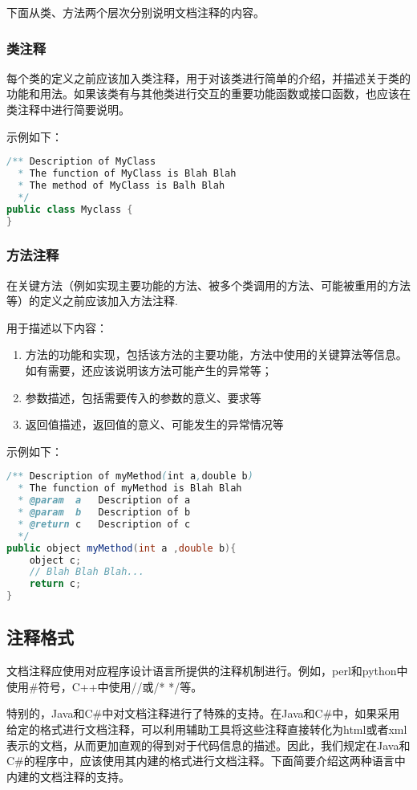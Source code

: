 下面从类、方法两个层次分别说明文档注释的内容。
\subsubsection{类注释}

每个类的定义之前应该加入类注释，用于对该类进行简单的介绍，并描述关于类的功能和用法。如果该类有与其他类进行交互的重要功能函数或接口函数，也应该在类注释中进行简要说明。

示例如下：

\begin{lstlisting}[language=java]
/** Description of MyClass
  * The function of MyClass is Blah Blah 	
  * The method of MyClass is Balh Blah
  */
public class Myclass {
}
\end{lstlisting}

\subsubsection{方法注释}

在关键方法（例如实现主要功能的方法、被多个类调用的方法、可能被重用的方法等）的定义之前应该加入方法注释.

用于描述以下内容：
\begin{enumerate}
\item 方法的功能和实现，包括该方法的主要功能，方法中使用的关键算法等信息。如有需要，还应该说明该方法可能产生的异常等；
\item 参数描述，包括需要传入的参数的意义、要求等
\item 返回值描述，返回值的意义、可能发生的异常情况等
\end{enumerate}
示例如下：

\begin{lstlisting}[language=java]
/** Description of myMethod(int a,double b)
  * The function of myMethod is Blah Blah
  * @param  a 	Description of a 
  * @param  b	Description of b
  * @return c	Description of c
  */
public object myMethod(int a ,double b){
    object c;
    // Blah Blah Blah...
    return c;
}
\end{lstlisting}

\subsection{注释格式}

文档注释应使用对应程序设计语言所提供的注释机制进行。例如，perl和python中使用\#符号，C++中使用//或/* */等。

特别的，Java和C\#中对文档注释进行了特殊的支持。在Java和C\#中，如果采用给定的格式进行文档注释，可以利用辅助工具将这些注释直接转化为html或者xml表示的文档，从而更加直观的得到对于代码信息的描述。因此，我们规定在Java和C\#的程序中，应该使用其内建的格式进行文档注释。下面简要介绍这两种语言中内建的文档注释的支持。


